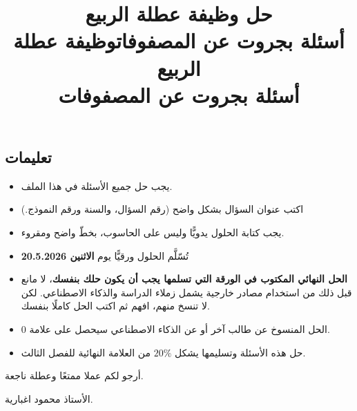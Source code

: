 \documentclass[14pt]{extarticle}
\title{حل وظيفة عطلة الربيع \\ أسئلة بجروت عن المصفوفات}
\title{وظيفة عطلة الربيع \\ أسئلة بجروت عن المصفوفات}
\begin{document}
\maketitle
\thispagestyle{fancy}


\subsection*{تعليمات}
{\large
\begin{itemize}[itemsep=1em]
    \item يجب حل جميع الأسئلة في هذا الملف.
    \item اكتب عنوان السؤال بشكل واضح (رقم السؤال، والسنة ورقم النموذج.)
    \item يجب كتابة الحلول يدويًّا وليس على الحاسوب، بخطّ واضح ومقروء.
    \item تُسّلَّم الحلول ورقيًّا يوم \textenglish{\textbf{الاثنين 20.5.2026}}
    \item \textbf{الحل النهائي المكتوب في الورقة التي تسلمها يجب أن يكون حلك بنفسك}، لا مانع قبل ذلك من استخدام مصادر خارجية يشمل زملاء الدراسة والذكاء الاصطناعي. لكن لا تنسخ منهم، افهم ثم اكتب الحل كاملًا بنفسك.
    \item الحل المنسوخ عن طالب آخر أو عن الذكاء الاصطناعي سيحصل على علامة 0.
    \item حل هذه الأسئلة وتسليمها يشكل $20\%$ من العلامة النهائية للفصل الثالث.
\end{itemize}
}

\vspace{1cm}
\begin{flushleft}
أرجو لكم عملا ممتعًا وعطلة ناجعة.

الأستاذ محمود اغبارية.
\end{flushleft}












\end{document}
